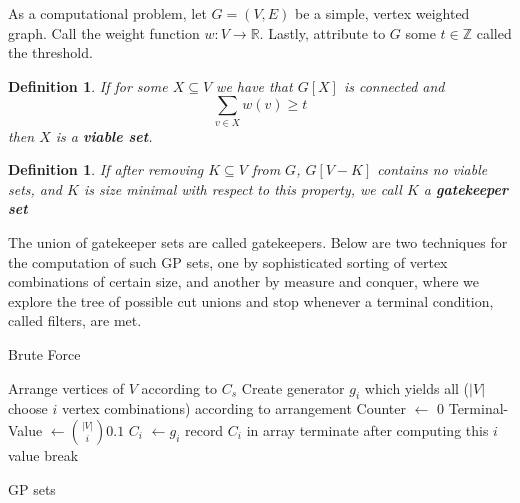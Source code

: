 \documentclass[a4paper]{article}
\newtheorem{definition}[theorem]{Definition}
\begin{document}
As a computational problem, let $G = (V,E)$ be a simple, vertex weighted graph. Call the weight function $w: V \rightarrow \mathbb{R}$. Lastly, attribute to $G$ some $t \in \mathbb{Z}$ called the threshold.  

\begin{definition}
If for some $X \subseteq V$ we have that $G[X]$ is connected and \[\sum_{v\in X}w(v) \geq t\] then $X$ is a {\bf viable set}.
\end{definition}

\begin{definition}
If after removing $K \subseteq V$ from $G$, $G[V-K]$ contains no viable sets, and $K$ is size minimal with respect to this property, we call $K$ a {\bf gatekeeper set}
\end{definition}

The union of gatekeeper sets are called gatekeepers. Below are two techniques for the computation of such GP sets, one by sophisticated sorting of vertex combinations of certain size, and another by measure and conquer, where we explore the tree of possible cut unions and stop whenever a terminal condition, called filters, are met.  

\begin{algorithm}
\caption{Brute Force}\label{euclid}
\begin{algorithmic}
\EndFor
\EndFunction


\State Arrange vertices of $V$ according to $C_s$ 
	\State Create generator $g_i$ which yields all ($|V|$ choose $i$ vertex combinations) according to arrangement
	\State Counter $\gets$ 0 
	\State Terminal-Value $\gets {\binom{|V|}{i}} 0.1$
	\State $C_i$ $\gets g_i$
	\State record $C_i$ in array
	\State terminate after computing this $i$ value
	\EndIf
	\State break
	\EndIf
	
\EndFor
\Return GP sets

\EndFunction
\end{algorithmic}
\end{algorithm}
\end{document}
